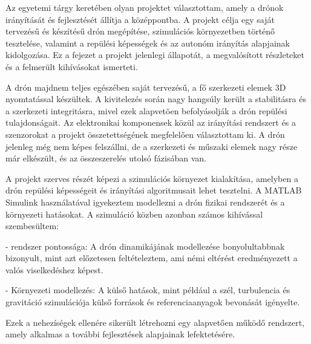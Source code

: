 Az egyetemi tárgy keretében olyan projektet választottam, amely a drónok irányítását és fejlesztését állítja a középpontba. A projekt célja egy saját tervezésű és készítésű drón megépítése, szimulációs környezetben történő tesztelése, valamint a repülési képességek és az autonóm irányítás alapjainak kidolgozása. Ez a fejezet a projekt jelenlegi állapotát, a megvalósított részleteket és a felmerült kihívásokat ismerteti.

A drón majdnem teljes egészében saját tervezésű, a fő szerkezeti elemek 3D nyomtatással készültek. A kivitelezés során nagy hangsúly került a stabilitásra és a szerkezeti integritásra, mivel ezek alapvetõen befolyásolják a drón repülési tulajdonságait. Az elektronikai komponensek közül az irányítási rendszert és a szenzorokat a projekt összetettségének megfelelően választottam ki. A drón jelenleg még nem képes felszállni, de a szerkezeti és műszaki elemek nagy része már elkészült, és az összeszerelés utolsó fázisában van.

A projekt szerves részét képezi a szimulációs környezet kialakítása, amelyben a drón repülési képességeit és irányítási algoritmusait lehet tesztelni. A MATLAB Simulink használatával igyekeztem modellezni a drón fizikai rendszerét és a környezeti hatásokat. A szimuláció közben azonban számos kihívással szembesültem:

-  rendszer pontossága: A drón dinamikájának modellezése bonyolultabbnak bizonyult, mint azt előzetesen feltételeztem, ami némi eltérést eredményezett a valós viselkedéshez képest.

- Környezeti modellezés: A külső hatások, mint például a szél, turbulencia és gravitáció szimulációja külső források és referenciaanyagok bevonását igényelte.

Ezek a nehezíségek ellenére sikerült létrehozni egy alapvetően működő rendszert, amely alkalmas a további fejlesztések alapjainak lefektetésére.
